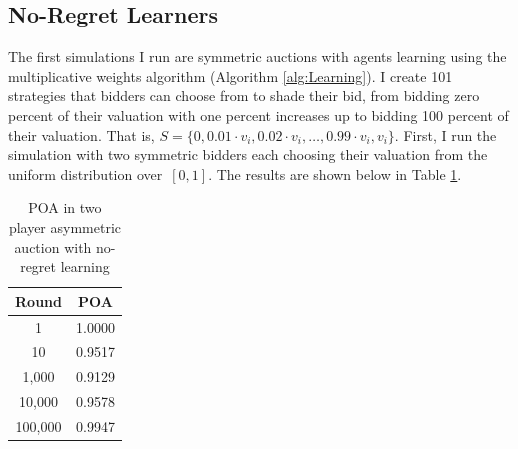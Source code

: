 \documentclass[12pt,twoside]{reedthesis}
\begin{document}
\subsection{No-Regret Learners}
The first simulations I run are symmetric auctions with agents learning using the multiplicative weights algorithm (Algorithm \ref{alg:Learning}). I create 101 strategies that bidders can choose from to shade their bid, from bidding zero percent of their valuation with one percent increases up to bidding 100 percent of their valuation. That is, $S = \{ 0, 0.01 \cdot v_i, 0.02 \cdot v_i, \ldots, 0.99 \cdot v_i, v_i \}$. First, I run the simulation with two symmetric bidders each choosing their valuation from the uniform distribution over~$[0,1]$. The results are shown below in Table \ref{table:3}.

\begin{table}[h!]
	\begin{center}
		\begin{tabular}{ |c|c| }
			\hline
			Round & POA \\
			\hline
			1 & 1.0000 \\
			10 & 0.9517 \\
			1,000 & 0.9129 \\
			10,000 & 0.9578 \\
			100,000 & 0.9947 \\
			\hline
		\end{tabular}
		\caption{POA in two player asymmetric auction with no-regret learning}
		\label{table:3}
	\end{center} 
\end{table}
\end{document}
